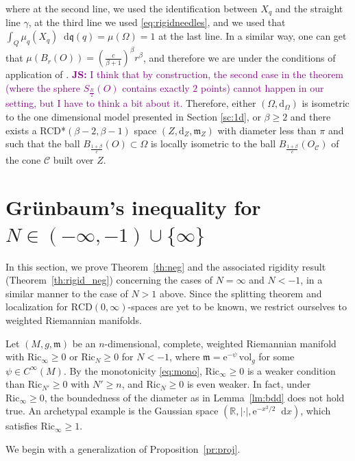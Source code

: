 \documentclass[sts]{imsart}
\theoremstyle{definition}
\theoremstyle{remark}
\newcommand{\R}{\mathbb{R}}
\newcommand{\fm}{\mathfrak{m}}
\newcommand{\fq}{\mathfrak{q}}
\newcommand{\dist}{\mathrm{d}}
\newcommand{\e}{\mathrm{e}}
\newcommand{\RCD}{\mathrm{RCD}}
\newcommand{\Ric}{\mathrm{Ric}}
\newcommand*\diff{\mathop{}\!\mathrm{d}}
\newcommand{\js}[1]{\textcolor{purple}{\textbf{JS:}  #1}}
\begin{document}
where at the second line, we used the identification between $X_q$ and the straight line $\gamma$, at the third line we used \eqref{eq:rigidneedles}, and we used that $\int_Q \mu_q(X_q) \diff \fq(q)= \mu(\Omega)=1$ at the last line. In a similar way, one can get that $\mu( B_r(O))=( \frac{c}{\beta +1} )^\beta r^\beta$, and therefore we are under the conditions of application of \cite[Theorem 1.1]{de2016volume}.
\js{I think that by construction, the second case in the theorem (where the sphere $S_{\frac{R}{2}}(O)$ contains exactly $2$ points) cannot happen in our setting, but I have to think a bit about it. } Therefore, either $(\Omega,\dist_\Omega)$ is isometric to the one dimensional model presented in Section \ref{sc:1d}, or $\beta\geq 2$ and there exists a RCD*$(\beta-2,\beta-1)$ space $(Z,\dist_Z,\fm_Z)$ with diameter less than $\pi$ and such that the ball $B_{\frac{1+\beta}{c}}(O)\subset \Omega$ is locally isometric to the ball $B_{\frac{1+\beta}{c}}(O_{\mathcal{C}})$ of the cone $\mathcal{C}$ built over $Z$.
\fi%


\section{Gr\"{u}nbaum’s inequality for $N \in (-\infty,-1) \cup \{\infty\}$}\label{sc:neg}%

In this section, we prove Theorem~\ref{th:neg} and the associated rigidity result (Theorem~\ref{th:rigid_neg}) concerning the cases of $N=\infty$ and $N<-1$, in a similar manner to the case of $N>1$ above.
Since the splitting theorem and localization for $\RCD(0,\infty)$-spaces are yet to be known, we restrict ourselves to weighted Riemannian manifolds.

Let $(M,g,\fm)$ be an $n$-dimensional, complete, weighted Riemannian manifold with $\Ric_{\infty} \ge 0$ or $\Ric_N \ge 0$ for $N<-1$, where $\fm=\e^{-\psi} \,\mathrm{vol}_g$ for some $\psi \in C^{\infty}(M)$.
By the monotonicity \eqref{eq:mono}, $\Ric_{\infty} \ge 0$ is a weaker condition than $\Ric_{N'} \ge 0$ with $N' \ge n$, and $\Ric_N \ge 0$ is even weaker.
In fact, under $\Ric_{\infty} \ge 0$, the boundedness of the diameter as in Lemma~\ref{lm:bdd} does not hold true.
An archetypal example is the Gaussian space $(\R,|\cdot|,\e^{-x^2/2} \diff x)$, which satisfies $\Ric_{\infty} \ge 1$.

We begin with a generalization of Proposition~\ref{pr:proj}.
\end{document}
